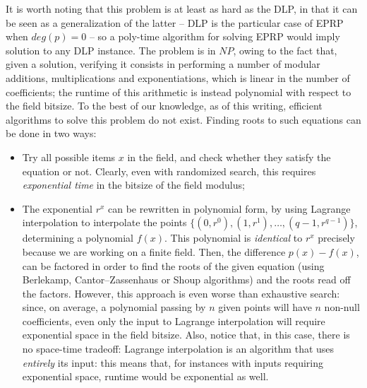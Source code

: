 \documentclass[10pt,journal,cspaper,compsoc]{IEEEtran}
\begin{document}
It is worth noting that this problem is at least as hard as the DLP, in that it can be seen as a generalization of the latter -- DLP is the particular case of EPRP when $deg(p) = 0$ -- so a poly-time algorithm for solving EPRP would imply solution to any DLP instance. The problem is in $NP$, owing to the fact that, given a solution, verifying it consists in performing a number of modular additions, multiplications and exponentiations, which is linear in the number of coefficients; the runtime of this arithmetic is instead polynomial with respect to the field bitsize. To the best of our knowledge, as of this writing, efficient algorithms to solve this problem  do not exist. Finding roots to such equations can be done in two ways:
\begin{itemize}
\item Try all possible items $x$ in the field, and check whether they satisfy the equation or not. Clearly, even with randomized search, this requires \emph{exponential time} in the bitsize of the field modulus;
\item The exponential $r^x$ can be rewritten in polynomial form, by using Lagrange interpolation to interpolate the points $\{(0,r^0),(1,r^1),\ldots,({q-1},r^{q-1})\}$, determining a polynomial $f(x)$. This polynomial is \emph{identical} to $r^{x}$ precisely because we are working on a finite field. Then, the difference $p(x) - f(x)$, can be factored in order to find the roots of the given equation (using Berlekamp, Cantor--Zassenhaus or Shoup algorithms) and the roots read off the factors. However, this approach is even worse than exhaustive search: since, on average, a polynomial passing by $n$ given points will have $n$ non-null coefficients, even only the input to Lagrange interpolation will require exponential space in the field bitsize. Also, notice that, in this case, there is no space-time tradeoff: Lagrange interpolation is an algorithm that uses \emph{entirely} its input: this means that, for instances with inputs requiring exponential space, runtime would be exponential as well.
\end{itemize}
\end{document}
